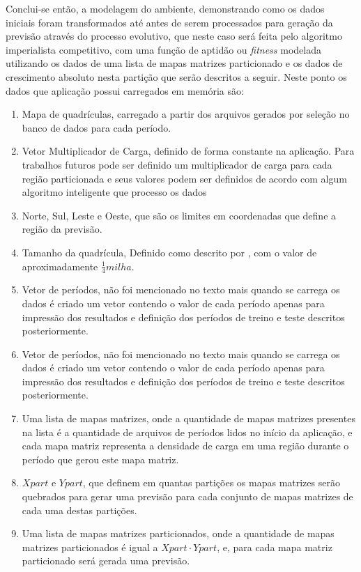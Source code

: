Conclui-se então, a modelagem do ambiente, demonstrando como os dados iniciais foram transformados até antes de serem processados para geração da previsão através do processo evolutivo, que neste caso será feita pelo algoritmo imperialista competitivo, com uma função de aptidão ou \emph{fitness} modelada utilizando os dados de uma lista de mapas matrizes particionado e os dados de crescimento absoluto nesta partição que serão descritos a seguir. Neste ponto os dados que aplicação possui carregados em memória são:
\begin{enumerate}
\item Mapa de quadrículas, carregado a partir dos arquivos gerados por seleção no banco de dados para cada período.
\item Vetor Multiplicador de Carga, definido de forma constante na aplicação. Para trabalhos futuros pode ser definido um multiplicador de carga para cada região particionada e seus valores podem ser definidos de acordo com algum algoritmo inteligente que processo os dados
\item Norte, Sul, Leste e Oeste, que são os limites em coordenadas que define a região da previsão.
\item Tamanho da quadrícula, Definido como descrito por \citeauthor{willis2002spatial}, com o valor de aproximadamente \(\frac{1}{4} milha\).
\item Vetor de períodos, não foi mencionado no texto mais quando se carrega os dados é criado um vetor contendo o valor de cada período apenas para impressão dos resultados  e definição dos períodos de treino e teste descritos posteriormente.
\item Vetor de períodos, não foi mencionado no texto mais quando se carrega os dados é criado um vetor contendo o valor de cada período apenas para impressão dos resultados  e definição dos períodos de treino e teste descritos posteriormente.
\item Uma lista de mapas matrizes, onde a quantidade de mapas matrizes presentes na lista é a quantidade de arquivos de períodos lidos no início da aplicação, e cada mapa matriz representa a densidade de carga em uma região durante o período que gerou este mapa matriz.
\item \(Xpart\) e \(Ypart\), que definem em quantas partições os mapas matrizes  serão quebrados para gerar uma previsão para cada conjunto de mapas matrizes de cada  uma destas partições.
\item Uma lista de mapas matrizes particionados, onde a quantidade de mapas matrizes particionados é igual a \(Xpart \cdot Ypart\),  e, para cada mapa matriz particionado será gerada uma previsão. 
\end{enumerate}


